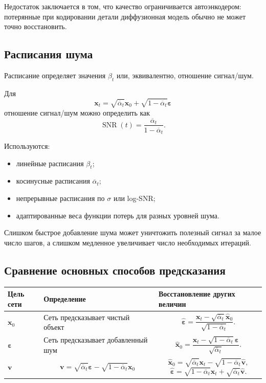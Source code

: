 \documentclass[12pt,a4paper]{article}
\theoremstyle{definition}
\newcommand{\eps}{\varepsilon}
\newcommand{\1}{\mathbf{1}}
\begin{document}
Недостаток заключается в том, что качество ограничивается
автоэнкодером: потерянные при кодировании детали диффузионная модель
обычно не может точно восстановить.

\subsection{Расписания шума}

Расписание определяет значения $\beta_t$ или, эквивалентно,
отношение сигнал/шум.

Для
\[
    \bm{x}_t
    =
    \sqrt{\overline{\alpha}_t}\bm{x}_0
    +
    \sqrt{1-\overline{\alpha}_t}\bm{\eps}
\]
отношение сигнал/шум можно определить как
\[
    \operatorname{SNR}(t)
    =
    \frac{\overline{\alpha}_t}
         {1-\overline{\alpha}_t}.
\]

Используются:
\begin{itemize}
    \item линейные расписания $\beta_t$;
    \item косинусные расписания $\overline{\alpha}_t$;
    \item непрерывные расписания по $\sigma$ или log-SNR;
    \item адаптированные веса функции потерь для разных уровней шума.
\end{itemize}

Слишком быстрое добавление шума может уничтожить полезный сигнал за
малое число шагов, а слишком медленное увеличивает число необходимых
итераций.

\subsection{Сравнение основных способов предсказания}

\begin{center}
\begin{tabular}{p{}p{}p{}}
\toprule
\textbf{Цель сети} &
\textbf{Определение} &
\textbf{Восстановление других величин}\\
\midrule
$\bm{x}_0$ &
Сеть предсказывает чистый объект &
\[
    \widehat{\bm{\eps}}
    =
    \frac{
        \bm{x}_t-\sqrt{\overline{\alpha}_t}\widehat{\bm{x}}_0
    }{
        \sqrt{1-\overline{\alpha}_t}
    }.
\]\\
\addlinespace
$\bm{\eps}$ &
Сеть предсказывает добавленный шум &
\[
    \widehat{\bm{x}}_0
    =
    \frac{
        \bm{x}_t
        -
        \sqrt{1-\overline{\alpha}_t}\widehat{\bm{\eps}}
    }{
        \sqrt{\overline{\alpha}_t}
    }.
\]\\
\addlinespace
$\bm{v}$ &
\[
    \bm{v}
    =
    \sqrt{\overline{\alpha}_t}\bm{\eps}
    -
    \sqrt{1-\overline{\alpha}_t}\bm{x}_0
\]
&
\[
    \widehat{\bm{x}}_0
    =
    \sqrt{\overline{\alpha}_t}\bm{x}_t
    -
    \sqrt{1-\overline{\alpha}_t}\widehat{\bm{v}},
\]
\[
    \widehat{\bm{\eps}}
    =
    \sqrt{1-\overline{\alpha}_t}\bm{x}_t
    +
    \sqrt{\overline{\alpha}_t}\widehat{\bm{v}}.
\]\\
\bottomrule
\end{tabular}
\end{center}
\end{document}
